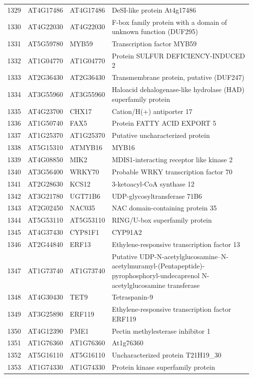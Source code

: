 \documentclass[11pt]{article}
\begin{document}
\begin{center}
\begin{tabular}{rlll}
1329 & AT4G17486 & AT4G17486 & DeSI-like protein At4g17486\\
1330 & AT4G22030 & AT4G22030 & F-box family protein with a domain of unknown function (DUF295)\\
1331 & AT5G59780 & MYB59 & Transcription factor MYB59\\
1332 & AT1G04770 & AT1G04770 & Protein SULFUR DEFICIENCY-INDUCED 2\\
1333 & AT2G36430 & AT2G36430 & Transmembrane protein, putative (DUF247)\\
1334 & AT3G55960 & AT3G55960 & Haloacid dehalogenase-like hydrolase (HAD) superfamily protein\\
1335 & AT4G23700 & CHX17 & Cation/H(+) antiporter 17\\
1336 & AT1G50740 & FAX5 & Protein FATTY ACID EXPORT 5\\
1337 & AT1G25370 & AT1G25370 & Putative uncharacterized protein\\
1338 & AT5G15310 & ATMYB16 & MYB16\\
1339 & AT4G08850 & MIK2 & MDIS1-interacting receptor like kinase 2\\
1340 & AT3G56400 & WRKY70 & Probable WRKY transcription factor 70\\
1341 & AT2G28630 & KCS12 & 3-ketoacyl-CoA synthase 12\\
1342 & AT3G21780 & UGT71B6 & UDP-glycosyltransferase 71B6\\
1343 & AT2G02450 & NAC035 & NAC domain-containing protein 35\\
1344 & AT5G53110 & AT5G53110 & RING/U-box superfamily protein\\
1345 & AT4G37430 & CYP81F1 & CYP91A2\\
1346 & AT2G44840 & ERF13 & Ethylene-responsive transcription factor 13\\
1347 & AT1G73740 & AT1G73740 & Putative UDP-N-acetylglucosamine--N-acetylmuramyl-(Pentapeptide)-pyrophosphoryl-undecaprenol N-acetylglucosamine transferase\\
1348 & AT4G30430 & TET9 & Tetraspanin-9\\
1349 & AT3G25890 & ERF119 & Ethylene-responsive transcription factor ERF119\\
1350 & AT4G12390 & PME1 & Pectin methylesterase inhibitor 1\\
1351 & AT1G76360 & AT1G76360 & At1g76360\\
1352 & AT5G16110 & AT5G16110 & Uncharacterized protein T21H19\_30\\
1353 & AT1G74330 & AT1G74330 & Protein kinase superfamily protein\\

\end{tabular}
\end{center}
\end{document}
